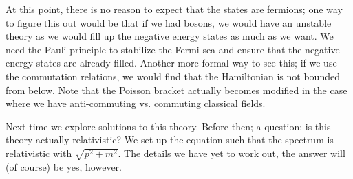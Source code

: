 At this point, there is no reason to expect that the states are fermions; one way to figure this out would be that if we had bosons, we would have an unstable theory as we would fill up the negative energy states as much as we want. We need the Pauli principle to stabilize the Fermi sea and ensure that the negative energy states are already filled. Another more formal way to see this; if we use the commutation relations, we would find that the Hamiltonian is not bounded from below. Note that the Poisson bracket actually becomes modified in the case where we have anti-commuting vs. commuting classical fields.

Next time we explore solutions to this theory. Before then; a question; is this theory actually relativistic? We set up the equation such that the spectrum is relativistic with $\sqrt{p^2 + m^2}$. The details we have yet to work out, the answer will (of course) be yes, however.